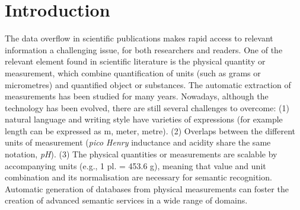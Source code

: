 \documentclass[sigconf]{acmart}
\begin{document}


\maketitle

\section{Introduction}

The data overflow in scientific publications makes rapid access to relevant information a challenging issue, for both researchers and readers. 
One of the relevant element found in scientific literature is the physical quantity or measurement, which combine quantification of units (such as grams or micrometres) and quantified object or substances. The automatic extraction of measurements has been studied for many years. Nowadays, although the technology has been evolved, there are still several challenges to overcome: (1) natural language and writing style have varieties of expressions (for example length can be expressed as m, meter, metre). (2) Overlaps between the different units of measurement (\textit{pico Henry} inductance and acidity share the same notation, \textit{pH}). (3) The physical quantities or measurements are scalable by accompanying units (e.g., 1 pl. = 453.6 g), meaning that value and unit combination and its normalisation are necessary for semantic recognition. Automatic generation of databases from physical measurements can foster the creation of advanced semantic services in a wide range of domains. 
\end{document}
